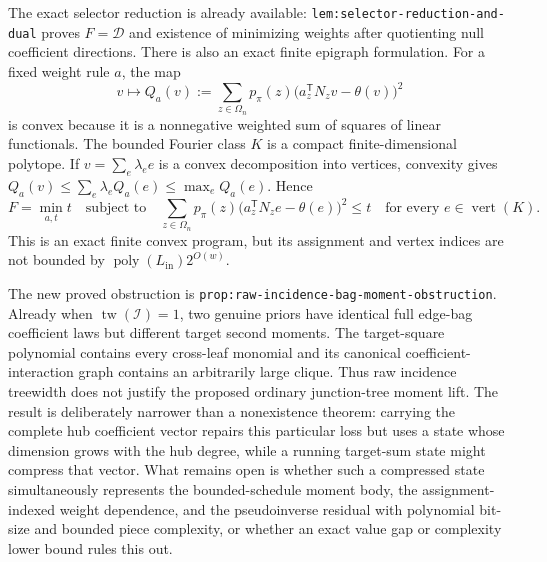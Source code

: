 The exact selector reduction is already available: \texttt{lem:selector-reduction-and-dual} proves \(F=\mathcal D\) and existence of minimizing weights after quotienting null coefficient directions.  There is also an exact finite epigraph formulation.  For a fixed weight rule \(a\), the map
\[
 v\longmapsto Q_a(v):=\sum_{z\in\Omega_n}p_\pi(z)
 \bigl(a_z^{\mathsf T}N_zv-\theta(v)\bigr)^2
\]
is convex because it is a nonnegative weighted sum of squares of linear functionals.  The bounded Fourier class \(K\) is a compact finite-dimensional polytope.  If \(v=\sum_e\lambda_e e\) is a convex decomposition into vertices, convexity gives \(Q_a(v)\le\sum_e\lambda_eQ_a(e)\le\max_eQ_a(e)\).  Hence
\[
 F=\min_{a,t}t
 \quad\text{subject to}\quad
 \sum_{z\in\Omega_n}p_\pi(z)
 \bigl(a_z^{\mathsf T}N_ze-\theta(e)\bigr)^2\le t
 \quad\text{for every }e\in\operatorname{vert}(K).
\]
This is an exact finite convex program, but its assignment and vertex indices are not bounded by \(\operatorname{poly}(L_{\mathrm{in}})2^{O(w)}\).

The new proved obstruction is \texttt{prop:raw-incidence-bag-moment-obstruction}.  Already when \(\operatorname{tw}(\mathcal I)=1\), two genuine priors have identical full edge-bag coefficient laws but different target second moments.  The target-square polynomial contains every cross-leaf monomial and its canonical coefficient-interaction graph contains an arbitrarily large clique.  Thus raw incidence treewidth does not justify the proposed ordinary junction-tree moment lift.  The result is deliberately narrower than a nonexistence theorem: carrying the complete hub coefficient vector repairs this particular loss but uses a state whose dimension grows with the hub degree, while a running target-sum state might compress that vector.  What remains open is whether such a compressed state simultaneously represents the bounded-schedule moment body, the assignment-indexed weight dependence, and the pseudoinverse residual with polynomial bit-size and bounded piece complexity, or whether an exact value gap or complexity lower bound rules this out.